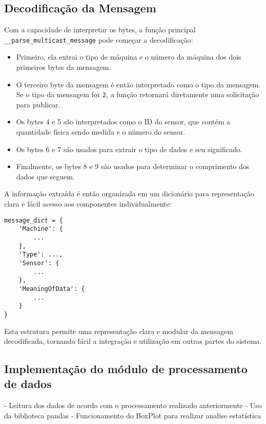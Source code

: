 \subsection{Decodificação da Mensagem}

Com a capacidade de interpretar os bytes, a função principal \texttt{\_\_parse\_multicast\_message} pode começar a decodificação:

\begin{itemize}
    \item Primeiro, ela extrai o tipo de máquina e o número da máquina dos dois primeiros bytes da mensagem.
    
    \item O terceiro byte da mensagem é então interpretado como o tipo da mensagem. Se o tipo da mensagem for \texttt{2}, a função retornará diretamente uma solicitação para publicar.
    
    \item Os bytes 4 e 5 são interpretados como o ID do sensor, que contém a quantidade física sendo medida e o número do sensor.
    
    \item Os bytes 6 e 7 são usados para extrair o tipo de dados e seu significado.
    
    \item Finalmente, os bytes 8 e 9 são usados para determinar o comprimento dos dados que seguem.
\end{itemize}

A informação extraída é então organizada em um dicionário para representação clara e fácil acesso aos componentes individualmente:

\begin{verbatim}
message_dict = {
    'Machine': {
        ...
    },
    'Type': ...,
    'Sensor': {
        ...
    },
    'MeaningOfData': {
        ...
    }
}
\end{verbatim}

Esta estrutura permite uma representação clara e modular da mensagem decodificada, tornando fácil a integração e utilização em outras partes do sistema.



\subsection[Implementação do módulo de processamento de dados]{Implementação do módulo de processamento de dados}
- Leitura dos dados de acordo com o processamento realizado anteriormente
- Uso da biblioteca pandas
- Funcionamento do BoxPlot para realizar analise estatística

